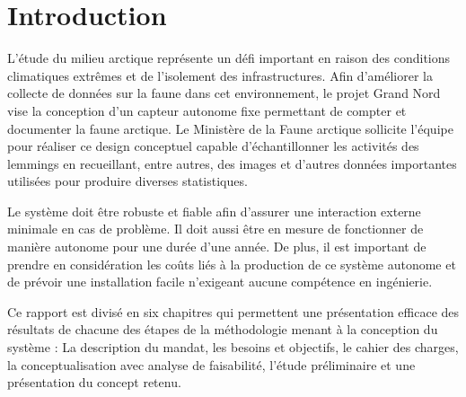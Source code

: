 %
%

\chapter{Introduction}
\label{s:intro}

L'étude du milieu arctique représente un défi important en raison des conditions climatiques extrêmes et de l'isolement des infrastructures.
Afin d'améliorer la collecte de données sur la faune dans cet environnement, le projet Grand Nord vise la conception d'un capteur autonome fixe permettant de compter et documenter la faune arctique.
Le Ministère de la Faune arctique sollicite l'équipe pour réaliser ce design conceptuel capable d'échantillonner les activités des lemmings en recueillant, entre autres, des images et d'autres données importantes utilisées pour produire diverses statistiques.

\bigskip
Le système doit être robuste et fiable afin d'assurer une interaction externe minimale en cas de problème.
Il doit aussi être en mesure de fonctionner de manière autonome pour une durée d'une année.
De plus, il est important de prendre en considération les coûts liés à la production de ce système autonome et de prévoir une installation facile n'exigeant aucune compétence en ingénierie.

\bigskip
Ce rapport est divisé en six chapitres qui permettent une présentation efficace des résultats de chacune des étapes de la méthodologie menant à la conception du système : La description du mandat, les besoins et objectifs, le cahier des charges, la conceptualisation avec analyse de faisabilité, l'étude préliminaire et une présentation du concept retenu.